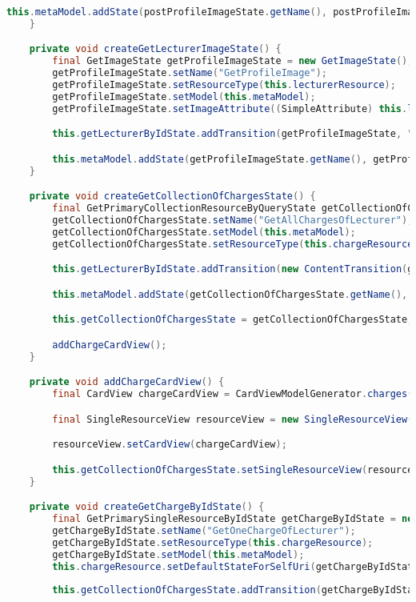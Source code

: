 \begin{lstlisting}[label=lst:enfield_model,
language=java,
firstnumber=1,
caption=Beschreibung des \textit{Enfield-Modell} der Referenzimplementierung. ]
		this.metaModel.addState(postProfileImageState.getName(), postProfileImageState);
	}

	private void createGetLecturerImageState() {
		final GetImageState getProfileImageState = new GetImageState();
		getProfileImageState.setName("GetProfileImage");
		getProfileImageState.setResourceType(this.lecturerResource);
		getProfileImageState.setModel(this.metaModel);
		getProfileImageState.setImageAttribute((SimpleAttribute) this.lecturerResource.getAttributeByName("profileImageUrl"));

		this.getLecturerByIdState.addTransition(getProfileImageState, "getProfileImage");

		this.metaModel.addState(getProfileImageState.getName(), getProfileImageState);
	}

	private void createGetCollectionOfChargesState() {
		final GetPrimaryCollectionResourceByQueryState getCollectionOfChargesState = new GetPrimaryCollectionResourceByQueryState();
		getCollectionOfChargesState.setName("GetAllChargesOfLecturer");
		getCollectionOfChargesState.setModel(this.metaModel);
		getCollectionOfChargesState.setResourceType(this.chargeResource);

		this.getLecturerByIdState.addTransition(new ContentTransition(getCollectionOfChargesState));

		this.metaModel.addState(getCollectionOfChargesState.getName(), getCollectionOfChargesState);

		this.getCollectionOfChargesState = getCollectionOfChargesState;

		addChargeCardView();
	}

	private void addChargeCardView() {
		final CardView chargeCardView = CardViewModelGenerator.charges();

		final SingleResourceView resourceView = new SingleResourceView();

		resourceView.setCardView(chargeCardView);

		this.getCollectionOfChargesState.setSingleResourceView(resourceView);
	}

	private void createGetChargeByIdState() {
		final GetPrimarySingleResourceByIdState getChargeByIdState = new GetPrimarySingleResourceByIdState();
		getChargeByIdState.setName("GetOneChargeOfLecturer");
		getChargeByIdState.setResourceType(this.chargeResource);
		getChargeByIdState.setModel(this.metaModel);
		this.chargeResource.setDefaultStateForSelfUri(getChargeByIdState);
		
		this.getCollectionOfChargesState.addTransition(getChargeByIdState);


\end{lstlisting}
